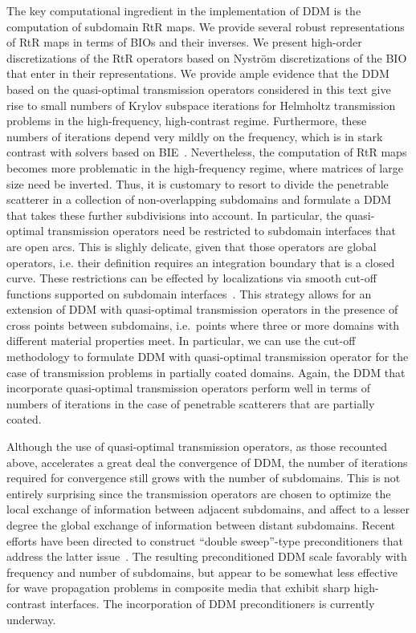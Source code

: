 \documentclass[11pt]{article}
\numberwithin{equation}{section}
\begin{document}
The key computational ingredient in the implementation of DDM is the computation of subdomain RtR maps. We provide several robust representations of RtR maps in terms of BIOs and their inverses. We present high-order discretizations of the RtR operators based on Nystr\"om discretizations of the BIO that enter in their representations. We provide ample evidence that the DDM based on the quasi-optimal transmission operators considered in this text give rise to small numbers of Krylov subspace iterations for Helmholtz transmission problems in the high-frequency, high-contrast regime. Furthermore, these numbers of iterations depend very mildly on the frequency, which is in stark contrast with solvers based on BIE~\cite{turc2}. Nevertheless, the computation of RtR maps becomes more problematic in the high-frequency regime, where matrices of large size need be inverted. Thus, it is customary to resort to divide the penetrable scatterer in a collection of non-overlapping subdomains and formulate a DDM that takes these further subdivisions into account. In particular, the quasi-optimal transmission operators need be restricted to subdomain interfaces that are open arcs. This is slighly delicate, given that those operators are global operators, i.e. their definition requires an integration boundary that is a closed curve. These restrictions can be effected by localizations via smooth cut-off functions supported on subdomain interfaces~\cite{jerez2017multitrace}. This strategy allows for an extension of DDM with quasi-optimal transmission operators in the presence of cross points between subdomains, i.e.~points where three or more domains with different material properties meet. In particular, we can use the cut-off methodology to formulate DDM with quasi-optimal transmission operator for the case of transmission problems in partially coated domains. Again, the DDM that incorporate quasi-optimal transmission operators perform well in terms of numbers of iterations in the case of penetrable scatterers that are partially coated.  

Although the use of quasi-optimal transmission operators, as those recounted above, accelerates a great deal the convergence of DDM, the number of iterations required for convergence still grows with the number of subdomains. This is not entirely surprising since the transmission operators are chosen to optimize the local exchange of information between adjacent subdomains, and affect to a lesser degree the global exchange of information between distant subdomains. Recent efforts have been directed to construct ``double sweep''-type preconditioners that address the latter issue~\cite{vion2014double,zepeda2016method}. The resulting preconditioned DDM scale favorably with frequency and number of subdomains, but appear to be somewhat less effective for wave propagation problems in composite media that exhibit sharp high-contrast interfaces. The incorporation of DDM preconditioners is currently underway.  
\end{document}
